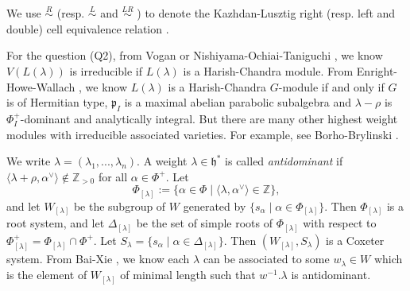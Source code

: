 \documentclass{amsart}[12pt]
\newtheorem{Thm}[Lem]{Theorem}
\newcommand{\Wsmall}{W_{[\lambda]}}
\newcommand{\al}{\alpha}
\newcommand{\mf}[1]{\mathfrak{#1}}
\newcommand{\bil}[2]{\langle{#1},{#2}^{\vee} \rangle }
\newcommand{\hs}{ \mathfrak{h}^*}
\numberwithin{equation}{section}
\begin{document}
We use $\stackrel{R}{\sim}$ (resp. $\stackrel{L}{\sim}$ and $\stackrel{LR}{\sim}$ ) to denote the Kazhdan-Lusztig right (resp. left and double) cell equivalence relation \cite{KL} .
%


For the question (Q2), from Vogan \cite{Vo91} or Nishiyama-Ochiai-Taniguchi \cite{NOT}, we know  $V(L(\lambda)) $ is irreducible if  $L(\lambda) $ is a Harish-Chandra module.   From Enright-Howe-Wallach \cite{EHW}, we know  $L(\lambda) $ is a Harish-Chandra $G$-module if and only if $G$ is of Hermitian type, $\mathfrak{p}_I$ is a maximal abelian parabolic subalgebra and $\lambda-\rho$ is $\Phi_I^+$-dominant and analytically integral. But there are many other highest weight modules with irreducible associated varieties. For example, see Borho-Brylinski \cite[Corollary 4.3]{BoB3}.


We write $\lambda=(\lambda_1,...,\lambda_n)$.
 A weight $ \lambda\in\hs $ is called \textit{antidominant} if $ \bil{\lambda+\rho}{\al} \notin\mathbb{Z}_{>0}$ for all $ \al\in\Phi^+ $. Let   \begin{equation}\label{eq:phil}
\Phi_{[\lambda]}:=\{\al\in\Phi\mid \bil{\lambda}{\al}\in\mathbb{Z} \},
\end{equation}
and let $ \Wsmall $ be the subgroup of $ W $ generated by $ \{s_\al\mid \al\in\Phi_{[\lambda]} \} $.
Then $\Phi_{[\lambda]}  $ is a root system, and let $ \Delta_{[\lambda]} $ be the set of simple roots of $ \Phi_{[\lambda]} $ with respect to  $ \Phi_{[\lambda]}^+=\Phi_{[\lambda]}\cap\Phi^+$.
Let $ S_\lambda=\{s_\alpha\mid \alpha\in \Delta_{[\lambda]} \} $. Then $ (\Wsmall,S_\lambda) $ is a Coxeter system.
From Bai-Xie \cite{BX}, we know each $\lambda$ can be associated to some $w_{\lambda}\in W$ which is the element of $ \Wsmall $ of minimal length such that $ w^{-1}.\lambda $ is antidominant.
\end{document}
